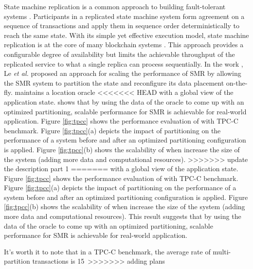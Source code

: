 State machine replication is a common approach to building fault-tolerant
systems \cite{Lam78, Sch90}. Participants in a replicated state machine system
form agreement on a sequence of transactions and apply them in sequence order
deterministically to reach the same state. With its simple yet effective
execution model, state machine replication is at the core of many blockchain
systems \cite{baudet2019state, cachin2016architecture}. This approach provides a
configurable degree of availability but limits the achievable throughput of the
replicated service to what a single replica can process sequentially. In the
work \dynastar \cite{le2019dynastar}, Le \emph{et al.} proposed an approach for
scaling the performance of SMR by allowing the SMR system to partition the state and
reconfigure its data placement on-the-fly. \dynastar maintains a location oracle
<<<<<<< HEAD
with a global view of the application state. \dynastar shows that by using the
data of the oracle to come up with an optimized partitioning, scalable
performance for SMR is achievable for real-world application. Figure
\ref{fig:tpcc} shows the performance evaluation of \dynastar with TPC-C
benchmark. Figure \ref{fig:tpcc}(a) depicts the impact of partitioning on the
performance of a system before and after an optimized partitioning configuration
is applied. Figure \ref{fig:tpcc}(b) shows the scalability of \dynastar when
increase the size of the system (adding more data and computational resources). 
>>>>>>> update the description part 1
=======
with a global view of the application state. Figure \ref{fig:tpcc} shows the
performance evaluation of \dynastar with TPC-C benchmark. Figure
\ref{fig:tpcc}(a) depicts the impact of partitioning on the performance of a
system before and after an optimized partitioning configuration is applied.
Figure \ref{fig:tpcc}(b) shows the scalability of \dynastar when increase the
size of the system (adding more data and computational resources). This result
suggests that by using the data of the oracle to come up with an optimized
partitioning, scalable performance for SMR is achievable for real-world
application.

It's worth it to
 note that in a TPC-C benchmark, the average rate of multi-partition transactions
 is 15\
>>>>>>> adding plans

